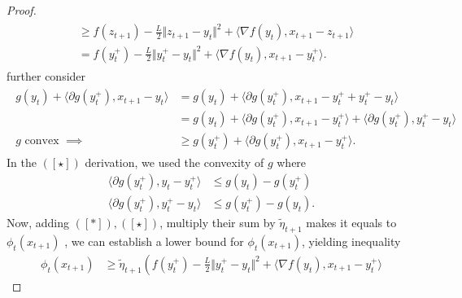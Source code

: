 \documentclass[12pt]{article}
\begin{document}
\begin{proof}
\begin{align*}
\begin{aligned}
                &\ge 
                f(z_{t + 1}) - \frac{L}{2} \Vert z_{t + 1} - y_t\Vert^2 + 
                \langle \nabla f(y_t), x_{t +1} - z_{t + 1}\rangle
                \\
                &= 
                f(y_t^+) - \frac{L}{2}\Vert y_t^+ - y_t\Vert^2
                + \langle \nabla f(y_t), x_{t + 1} - y_t^+\rangle.     
            \end{aligned}
            \tag{$[*]$}
        \end{align*}
        further consider
        \begin{align*}
            \begin{aligned}
                g(y_t) + \langle \partial g(y_t^+), x_{t + 1} - y_t\rangle 
                &= g(y_t) + 
                \langle \partial g(y_t^+), 
                x_{t + 1} - y_t^+ + y_t^+ - y_t
                \rangle
                \\
                &= g(y_t) 
                + \langle \partial g (y_t^+),
                    x_{t + 1} - y_t^+
                \rangle
                + 
                \langle 
                    \partial g(y_t^+), y_t^+ - y_t
                \rangle
                \\
                g \text{ convex }\implies 
                &\ge 
                g(y_t^+) + 
                \langle \partial g(y_t^+), x_{t + 1} - y_t^+\rangle. 
            \end{aligned}
            \tag{$[\star]$}
        \end{align*}
        In the $([\star])$ derivation, we used the convexity of $g$ where 
        \begin{align*}
            \langle \partial g(y_t^+), y_t - y_t^+\rangle
            &\le g(y_t) - g(y_t^+)
            \\
            \langle \partial g (y_t^+), y_t^+ - y_t \rangle
            &\le 
            g(y_t^+) - g(y_t). 
        \end{align*}
        Now, adding $([*]), ([\star])$, multiply their sum by $\tilde\eta_{t + 1}$ makes it equals to $\phi_t(x_{t +1 })$ , we can establish a lower bound for $\phi_t(x_{t + 1})$, yielding inequality 
        {\small
            \begin{align*}
                \phi_t(x_{t + 1})
                &\ge 
                \tilde\eta_{t + 1}
                \left(
                    f(y_t^+) - \frac{L}{2}\Vert y_t^+ - y_t\Vert^2 
                    +
                    \langle \nabla f(y_t), x_{t + 1} - y_t^+\rangle

\end{align*}}
\end{proof}
\end{document}
